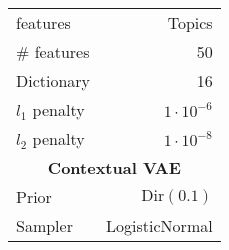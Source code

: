 \documentclass[twoside,11pt]{article}
\begin{document}
\begin{table}[t!]
\begin{subtable}[t]{.49\textwidth}
\begin{tabular}[t]{@{}l|r@{}}
    features                            & Topics                \\
    \# features                         & 50                    \\
    Dictionary                          & 16                    \\
    $l_1$ penalty                       & $1 \cdot 10^{-6}$     \\
    $l_2$ penalty                       & $1 \cdot 10^{-8}$     \\
    \midrule[.75pt]
    \multicolumn{2}{c}{\textbf{Contextual VAE}}                 \\
    \midrule
    Prior                               & $\mathrm{Dir}(0.1)$   \\
    Sampler                             & LogisticNormal        \\
    \bottomrule
\end{tabular}
\end{subtable}
\end{table}
\end{document}
